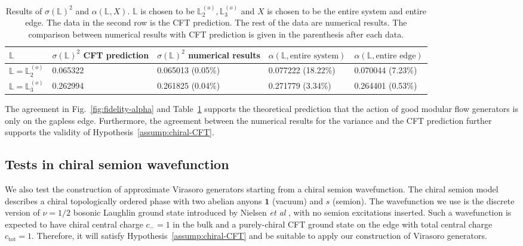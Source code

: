 \documentclass[12pt, nofootinbib]{article}
\theoremstyle{plain}
\theoremstyle{assumption}
\theoremstyle{definition}
\theoremstyle{plain}
\theoremstyle{plain}
\theoremstyle{plain}
\theoremstyle{plain}
\theoremstyle{plain}
\def\Lb{\mathbb{L}}
\def\Lbo{\mathbb{L}^{(o)}}
\begin{document}
\begin{table}[!h]
\begin{tabular}{|l|l|l|l|l|}
\hline
$\Lb$          & \makecell{$\sigma(\Lb)^2$ CFT \\ prediction} & \makecell{$\sigma(\Lb)^2$ numerical \\ results} & $\alpha(\Lb,\text{entire system})$ & $\alpha(\Lb,\text{entire edge})$ \\ \hline
$\Lb = \Lbo_2$ & 0.065322                       & 0.065013 (0.05\%)                  & 0.077222 (18.22\%)                 & 0.070044 (7.23\%)                \\ \hline
$\Lb = \Lbo_3$   & 0.262994                       & 0.261825 (0.04\%)                  & 0.271779 (3.34\%)                  & 0.264401 (0.53\%)                \\ \hline
\end{tabular}
\caption{Results of $\sigma(\Lb)^2$ and $\alpha(\Lb,X)$. $\Lb$ is chosen to be $\Lbo_2,\Lbo_3$ and $X$ is chosen to be the entire system and entire edge. The data in the second row is the CFT prediction. The rest of the data are numerical results. The comparison between numerical results with CFT prediction is given in the parenthesis after each data.}
\label{tab:alpha}
\end{table}

The agreement in Fig.~\ref{fig:fidelity-alpha} and Table~\ref{tab:alpha} supports the theoretical prediction that the action of good modular flow generators is only on the gapless edge.  
Furthermore, the agreement between the numerical results for the variance and the CFT prediction further supports the validity of Hypothesis~\ref{assump:chiral-CFT}.  


\subsection{Tests in chiral semion wavefunction}\label{sec:semion}

We also test the construction of approximate Virasoro generators starting from a chiral semion wavefunction. The chiral semion model describes a chiral topologically ordered phase with two abelian anyons $\mathbf{1}$ (vacuum) and $s$ (semion). The wavefunction we use is the discrete version of $\nu = 1/2$ bosonic Laughlin ground state introduced by Nielsen {\it et al} \cite{Nielsen2012}, with no semion excitations inserted. Such a wavefunction is expected to have chiral central charge $c_{-}=1$ in the bulk and a purely-chiral CFT ground state on the edge with total central charge $c_\text{tot}=1$. Therefore, it will satisfy Hypothesis~\ref{assump:chiral-CFT} and be suitable to apply our construction of Virasoro generators. 
\end{document}
